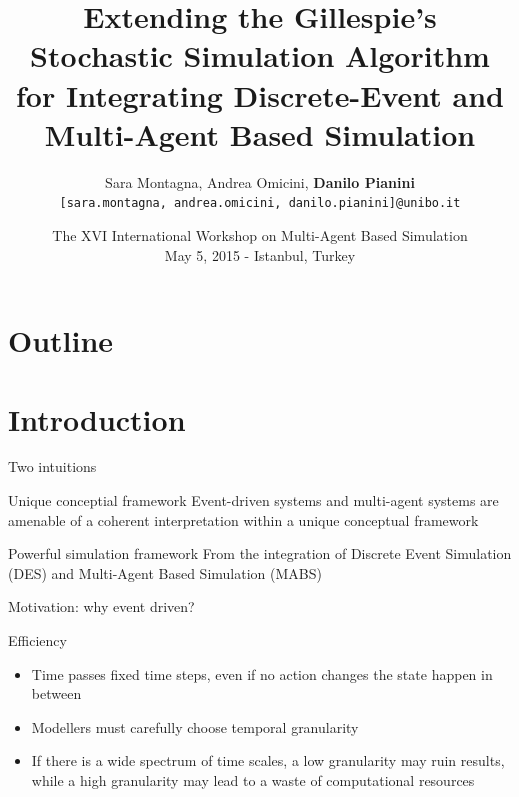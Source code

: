 \documentclass[presentation]{beamer} %
\title[Integrating DES and MABS]{Extending the Gillespie's Stochastic Simulation Algorithm for Integrating Discrete-Event and Multi-Agent Based Simulation}
\author[Montagna, Omicini, Pianini]{
Sara Montagna, Andrea Omicini, \textbf{Danilo Pianini}
\\
\texttt{{\footnotesize [sara.montagna, andrea.omicini, danilo.pianini]@unibo.it}}}
\institute[UNIBO]
{\textsc{Alma Mater Studiorum}---Universit\`a di Bologna a Cesena}
\date[2015-05-15 MABS]{The XVI International Workshop on Multi-Agent Based Simulation\\
\scriptsize May 5, 2015 - Istanbul, Turkey
}
\begin{document}
\frame[label=coverpage]{\titlepage}

\section*{Outline}
\frame{\tableofcontents}

\section{Introduction}
\begin{frame}{Two intuitions}
  \begin{block}{Unique conceptial framework}
    Event-driven systems and multi-agent systems are amenable of a coherent interpretation within a unique conceptual framework
  \end{block}
  \begin{block}{Powerful simulation framework}
    From the integration of Discrete Event Simulation (DES) and Multi-Agent Based Simulation (MABS)
  \end{block}
\end{frame}

\begin{frame}{Motivation: why event driven?}
  \begin{block}{Efficiency}
    \begin{itemize}
      \item Time passes fixed time steps, even if no action changes the state happen in between
      \item Modellers must carefully choose temporal granularity
      \item If there is a wide spectrum of time scales, a low granularity may ruin results, while a high granularity may lead to a waste of computational resources
    \end{itemize}
  \end{block}
\end{frame}
\end{document}
